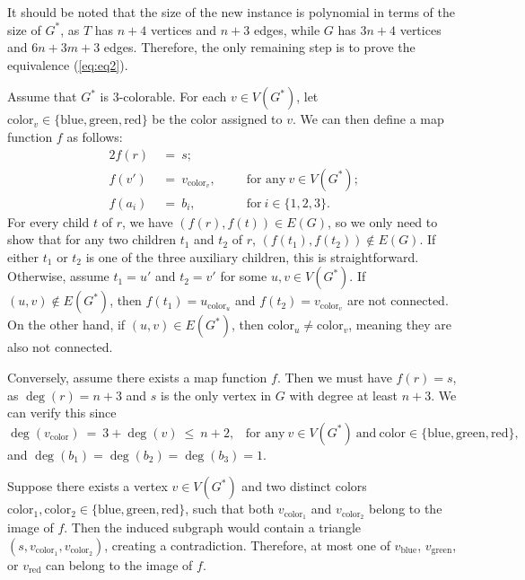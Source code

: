 \documentclass[12pt]{article}
\begin{document}
	\medskip
	
	It should be noted that the size of the new instance is polynomial in terms
	of the size of \(G^{\ast}\), as \(T\) has \(n + 4\) vertices and \(n + 3\)
	edges, while \(G\) has \(3n + 4\) vertices and \(6n + 3m + 3\) edges.
	Therefore, the only remaining step is to prove the equivalence
	(\ref{eq:eq2}).
	
	\medskip
	
	Assume that \(G^{\ast}\) is 3-colorable. For each \(v \in V(G^{\ast})\), let
	\(\text{color}_{v} \in \{\text{blue}, \text{green}, \text{red}\}\) be the
	color assigned to \(v\). We can then define a map function \(f\) as follows:
	\begin{alignat*}{2}
		f(r) \ &= \ s \text{;} & \quad & \\
		f(v') \ &= \ v_{\text{color}_v} \text{,} & \quad & \text{for any} \ v
		\in V(G^{\ast}) \text{;} \\
		f(a_{i}) \ &= \ b_{i} \text{,} & \quad & \text{for} \ i \in \{1, 2, 3\}
		\text{.}
	\end{alignat*}
	For every child \(t\) of \(r\), we have \((f(r), f(t)) \in E(G)\), so we
	only need to show that for any two children \(t_{1}\) and \(t_{2}\) of
	\(r\), \((f(t_{1}), f(t_{2})) \notin E(G)\). If either \(t_{1}\) or
	\(t_{2}\) is one of the three auxiliary children, this is straightforward.
	Otherwise, assume \(t_{1} = u'\) and \(t_{2} = v'\) for some \(u, v \in
	V(G^{\ast})\). If \((u, v) \notin E(G^{\ast})\), then \(f(t_{1}) =
	u_{\text{color}_{u}}\) and \(f(t_{2}) = v_{\text{color}_{v}}\) are not
	connected. On the other hand, if \((u, v) \in E(G^{\ast})\), then
	\(\text{color}_{u} \neq \text{color}_{v}\), meaning they are also not
	connected.
	
	\medskip
	
	Conversely, assume there exists a map function \(f\). Then we must have
	\(f(r) = s\), as \(\deg(r) = n + 3\) and \(s\) is the only vertex in \(G\)
	with degree at least \(n + 3\). We can verify this since
	\[ \deg(v_{\text{color}}) \ = \ 3 + \deg(v) \ \leqslant \ n + 2 \text{,}
	\quad \text{for any} \ v \in V(G^{\ast}) \ \text{and} \ \text{color} \in
	\{\text{blue}, \text{green}, \text{red}\} \text{,} \]
	and \(\deg(b_{1}) = \deg(b_{2}) = \deg(b_{3}) = 1\).
	
	\medskip
	
	Suppose there exists a vertex \(v \in V(G^{\ast})\) and two distinct colors
	\(\text{color}_{1}, \text{color}_{2} \in \{\text{blue}, \text{green},
	\allowbreak \text{red}\}\), such that both \(v_{\text{color}_{1}}\) and
	\(v_{\text{color}_{2}}\) belong to the image of \(f\). Then the induced
	subgraph would contain a triangle \((s, v_{\text{color}_{1}},
	v_{\text{color}_{2}})\), creating a contradiction. Therefore, at most one of
	\(v_{\text{blue}}\), \(v_{\text{green}}\), or \(v_{\text{red}}\) can belong
	to the image of \(f\).
	
\end{document}
